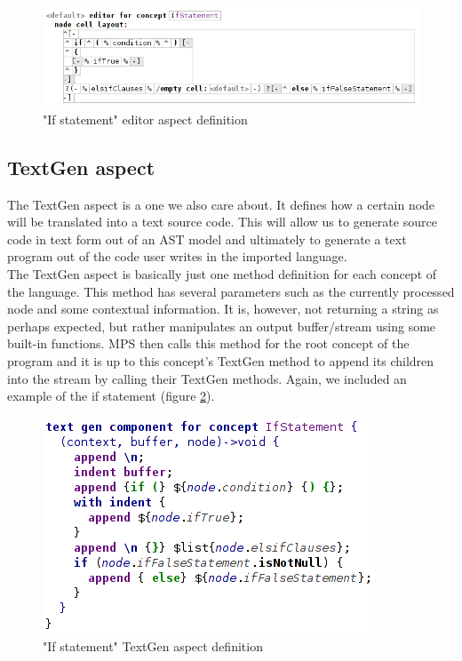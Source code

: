 \begin{figure}[h]
	\centering
	\includegraphics[width=\textwidth]{./img/if_statement_editor_definition.png}
	\caption{"If statement" editor aspect definition}
	\label{fig:if_editor_definition}
\end{figure}

\subsection{TextGen aspect}
The TextGen aspect is a one we also care about.
It defines how a certain node will be translated into a text source code.
This will allow us to generate source code in text form out of an AST model and ultimately to generate a text program out of the code user writes in the imported language.
\\

The TextGen aspect is basically just one method definition for each concept of the language.
This method has several parameters such as the currently processed node and some contextual information.
It is, however, not returning a string as perhaps expected, but rather manipulates an output buffer/stream using some built-in functions.
MPS then calls this method for the root concept of the program and it is up to this concept's TextGen method to append its children into the stream by calling their TextGen methods.
Again, we included an example of the if statement (figure \ref{fig:if_statement_textgen}).

\begin{figure}[h]
	\centering
	\includegraphics[scale=0.70]{./img/if_statement_textgen.png}
	\caption{"If statement" TextGen aspect definition}
	\label{fig:if_statement_textgen}
\end{figure}

